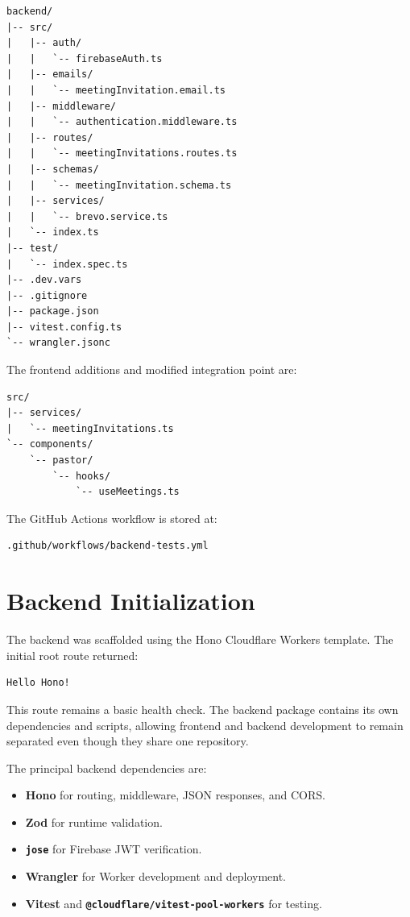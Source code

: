 \documentclass[11pt,a4paper,oneside]{report}
\begin{document}
\begin{lstlisting}
backend/
|-- src/
|   |-- auth/
|   |   `-- firebaseAuth.ts
|   |-- emails/
|   |   `-- meetingInvitation.email.ts
|   |-- middleware/
|   |   `-- authentication.middleware.ts
|   |-- routes/
|   |   `-- meetingInvitations.routes.ts
|   |-- schemas/
|   |   `-- meetingInvitation.schema.ts
|   |-- services/
|   |   `-- brevo.service.ts
|   `-- index.ts
|-- test/
|   `-- index.spec.ts
|-- .dev.vars
|-- .gitignore
|-- package.json
|-- vitest.config.ts
`-- wrangler.jsonc
\end{lstlisting}

The frontend additions and modified integration point are:

\begin{lstlisting}
src/
|-- services/
|   `-- meetingInvitations.ts
`-- components/
    `-- pastor/
        `-- hooks/
            `-- useMeetings.ts
\end{lstlisting}

The GitHub Actions workflow is stored at:

\begin{lstlisting}
.github/workflows/backend-tests.yml
\end{lstlisting}

\section{Backend Initialization}

The backend was scaffolded using the Hono Cloudflare Workers template. The initial root route returned:

\begin{lstlisting}
Hello Hono!
\end{lstlisting}

This route remains a basic health check. The backend package contains its own dependencies and scripts, allowing frontend and backend development to remain separated even though they share one repository.

The principal backend dependencies are:

\begin{itemize}
  \item \textbf{Hono} for routing, middleware, JSON responses, and CORS.
  \item \textbf{Zod} for runtime validation.
  \item \textbf{\texttt{jose}} for Firebase JWT verification.
  \item \textbf{Wrangler} for Worker development and deployment.
  \item \textbf{Vitest} and \textbf{\texttt{@cloudflare/vitest-pool-workers}} for testing.
\end{itemize}
\end{document}
